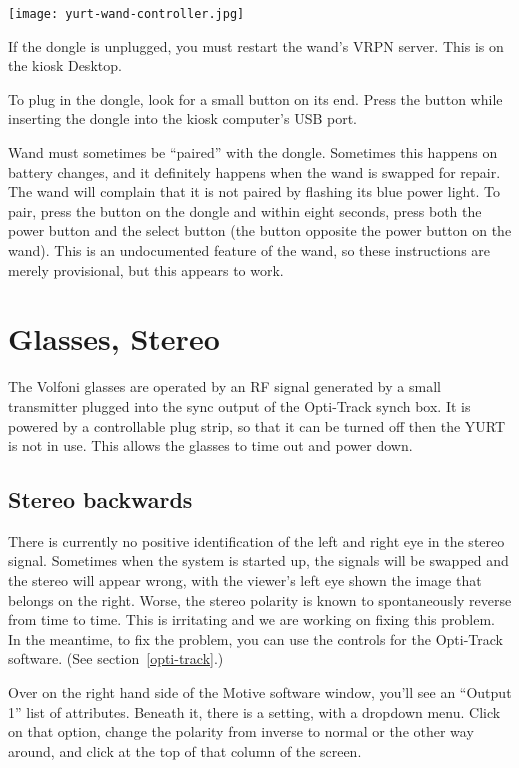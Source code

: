 \documentclass[11pt]{article}
\newcommand{\yurt}{YURT\xspace}
\newcommand{\menu}[1]{``#1''\xspace}
\newcommand{\button}[1]{\framebox{\textsf{#1}\xspace}}
\begin{document}
\begin{center}
\texttt{[image: yurt-wand-controller.jpg]}
\end{center}

If the dongle is unplugged, you must restart the wand's VRPN server.
This is on the kiosk Desktop.


To plug in the dongle, look for a small button on its end.  Press the
button while inserting the dongle into the kiosk computer's USB port.

Wand must sometimes be ``paired'' with the dongle.  Sometimes this
happens on battery changes, and it definitely happens when the wand is
swapped for repair.  The wand will complain that it is not paired by
flashing its blue power light.  To pair, press the button on the
dongle and within eight seconds, press both the power button and the
select button (the button opposite the power button on the wand).  This is an
undocumented feature of the wand, so these instructions are merely
provisional, but this appears to work.


\section{Glasses, Stereo}

The Volfoni glasses are operated by an RF signal generated by a small
transmitter plugged into the sync output of the Opti-Track synch box.
It is powered by a controllable plug strip, so that it can be turned
off then the \yurt is not in use.  This allows the glasses to time out
and power down.


\subsection{Stereo backwards}

There is currently no positive identification of the left and right
eye in the stereo signal.  Sometimes when the system is started
up, the signals will be swapped and the stereo will appear wrong, with
the viewer's left eye shown the image that belongs on the right.
Worse, the stereo polarity is known to spontaneously reverse from time to
time.  This is irritating and we are working on fixing this problem.
In the meantime, to fix the problem, you can use the controls for the
Opti-Track software.  (See section~\ref{opti-track}.)

Over on the right hand side of the Motive software window, you'll see
an \menu{Output 1} list of attributes.  Beneath it, there is a
\button{Polarity} setting, with a dropdown menu.  Click on that option,
change the polarity from inverse to normal or the other way around,
and click \button{Apply} at the top of that column of the screen.
\end{document}
